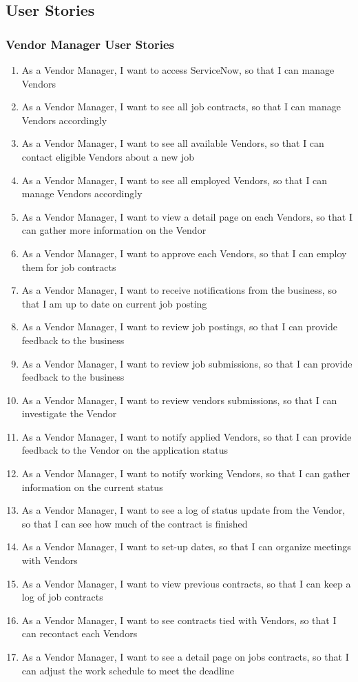 \documentclass[10pt]{article}
\begin{document}
\subsection{User Stories}

\subsubsection{Vendor Manager User Stories}

\begin{enumerate}
	
\item	As a Vendor Manager, I want to access ServiceNow, so that I can manage Vendors
\item	As a Vendor Manager, I want to see all job contracts, so that I can manage Vendors accordingly 
\item	As a Vendor Manager, I want to see all available Vendors, so that I can contact eligible Vendors about a new job
\item	As a Vendor Manager, I want to see all employed Vendors, so that I can manage Vendors accordingly
\item	As a Vendor Manager, I want to view a detail page on each Vendors, so that I can gather more information on the Vendor
\item	As a Vendor Manager, I want to approve each Vendors, so that I can employ them for job contracts
\item	As a Vendor Manager, I want to receive notifications from the business, so that I am up to date on current job posting
\item	As a Vendor Manager, I want to review job postings, so that I can provide feedback to the business
\item	As a Vendor Manager, I want to review job submissions, so that I can provide feedback to the business
\item	As a Vendor Manager, I want to review vendors submissions, so that I can investigate the Vendor
\item	As a Vendor Manager, I want to notify applied Vendors, so that I can provide feedback to the Vendor on the application status
\item	As a Vendor Manager, I want to notify working Vendors, so that I can gather information on the current status
\item	As a Vendor Manager, I want to see a log of status update from the Vendor, so that I can see how much of the contract is finished
\item	As a Vendor Manager, I want to set-up dates, so that I can organize meetings with Vendors
\item	As a Vendor Manager, I want to view previous contracts, so that I can keep a log of job contracts
\item	As a Vendor Manager, I want to see contracts tied with Vendors, so that I can recontact each Vendors
\item	As a Vendor Manager, I want to see a detail page on jobs contracts, so that I can adjust the work schedule to meet the deadline 
	
\end{enumerate}
	
\end{document}
